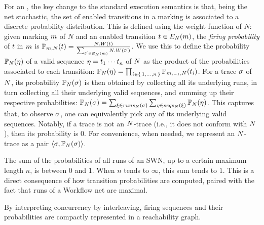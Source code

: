 For an \uswn, the key change to the standard execution semantics is that, being the net stochastic, the set of enabled transitions in a marking is associated to a discrete probability distribution. This is defined using the weight function of $N$: given marking $\marking$ of $N$ and an enabled transition $t \in \enaset{\marking}{\net}$, the \emph{firing probability} of $t$ in $\marking$ is $\probt{t}{\marking}{\net} = \frac{\net.W(t)}{\sum_{t'\in \enaset{\marking}{\net}}\net.W(t')}$. %
We use this to define the probability $\prob{\seq}{\net}$ of a valid sequence $\seq = t_1\cdots t_n$ of $\net$ as the product of the probabilities associated to each transition: $\prob{\seq}{\net} = \prod_{i \in \set{1,\ldots,n}}\probt{t_i}{\marking_{i-1}}{\net}$. %
For a trace $\nonlogtrace$ of $\net$, its probability $\prob{\nonlogtrace}{\net}$ is then obtained by collecting all its underlying runs, in turn collecting all their underlying valid sequences, and summing up their respective probabilities: $\prob{\nonlogtrace}{\net} = \sum_{\run \in \runs{\nonlogtrace}{\net}} \sum_{\seq \in \seqs{\run}{\net}} \prob{\seq}{\net}$. This captures that, to observe $\nonlogtrace$, one can equivalently pick any of its underlying valid sequences. Notably, if a trace is not an $\net$-trace (i.e., it does not conform with $\net$), then its probability is 0. For convenience, when needed, we represent an $\net$-trace as a pair $\tup{\nonlogtrace,\prob{\nonlogtrace}{\net}}$.


\begin{remark}
\label{rem:collective}
The sum of the probabilities of all runs of an SWN, up to a certain maximum length $n$, is between 0 and 1. When $n$ tends to $\infty$, this sum tends to $1$. This is a direct consequence of how transition probabilities are computed, paired with the fact that runs of a Workflow net are maximal.
\end{remark}

By interpreting concurrency by interleaving, firing sequences and their probabilities are compactly represented in a reachability graph.


